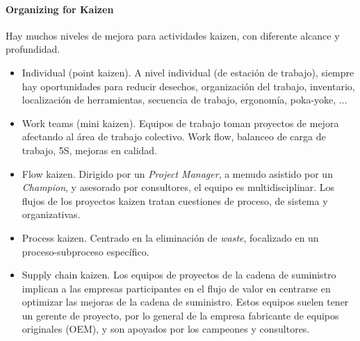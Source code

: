 \documentclass[oneside]{book}
\begin{document}
\paragraph{Organizing for Kaizen}

Hay muchos niveles de mejora para actividades kaizen, con diferente alcance y profundidad.
\begin{itemize}
	\item Individual (point kaizen). A nivel individual (de estación de trabajo), siempre hay oportunidades para reducir desechos, organización del trabajo, inventario, localización de herramientas, secuencia de trabajo, ergonomía, poka-yoke, ...
	\item Work teams (mini kaizen). Equipos de trabajo toman proyectos de mejora afectando al área de trabajo colectivo. Work flow, balanceo de carga de trabajo, 5S, mejoras en calidad.
	\item Flow kaizen. Dirigido por un \textit{Project Manager}, a menudo asistido por un \textit{Champion}, y asesorado por consultores, el equipo es multidisciplinar. Los flujos de los proyectos kaizen tratan cuestiones de proceso, de sistema y organizativas. 
	\item Process kaizen. Centrado en la eliminación de \textit{waste}, focalizado en un proceso-subproceso específico.
	\item Supply chain kaizen. Los equipos de proyectos de la cadena de suministro implican a las empresas participantes en el flujo de valor en centrarse en optimizar las mejoras de la cadena de suministro. Estos equipos suelen tener un gerente de proyecto, por lo general de la empresa fabricante de equipos originales (OEM), y son apoyados por los campeones y consultores.
\end{itemize}
\end{document}
